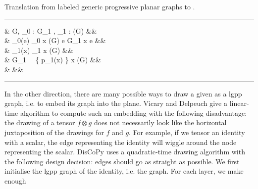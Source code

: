 \begin{python}
{\normalfont Translation from labeled generic progressive planar graphs to .}
\vspace{5pt}
\hrule
\vspace{-15pt}
\begin{flalign*}
 \s &  \s G, \s \lambda_0 : G_1 \to {}, \s \lambda_1 : \boxes(G) \to {} \s {}&&\\
& \py{dom = [} \s \lambda_0(e) \in \Sigma_0 \s {} \s x \in \dom(G) \s {} \s e \in G_1 \s {} \s x \in \partial e \s \py{]}&&\\
& \py{boxes = [} \s \lambda_1(x) \in \Sigma_1 \s {} \s x \in \boxes(G) \s \py{]}&&\\
& \py{offsets = [len(} \s G_1 \ \cap \ \R \times \{ p_1(x) \} \s {} \s x \in \boxes(G) \s \py{]}&&\\
&  &&
\vspace{-10pt}
\end{flalign*}
\hrule
\end{python}

In the other direction, there are many possible ways to draw a given  as a lgpp graph, i.e. to embed its graph into the plane.
Vicary and Delpeuch \cite{DelpeuchVicary18} give a linear-time algorithm to compute such an embedding with the following disadvantage: the drawing of a tensor $f \otimes g$ does not necessarily look like the horizontal juxtaposition of the drawings for $f$ and $g$.
For example, if we tensor an identity with a scalar, the edge representing the identity will wiggle around the node representing the scalar.
DisCoPy uses a quadratic-time drawing algorithm with the following design decision: edges should go as straight as possible.
We first initialise the lgpp graph of the identity, i.e. the graph.
For each layer, we make enough

%
%

